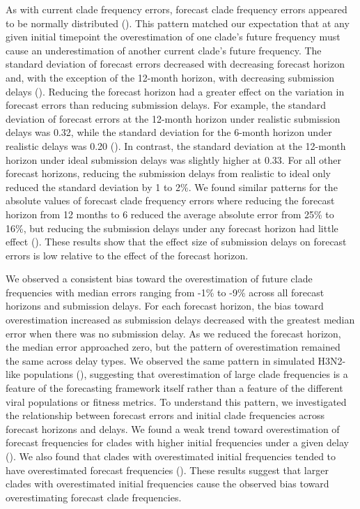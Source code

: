\documentclass[9pt,lineno]{elife}
\begin{document}
As with current clade frequency errors, forecast clade frequency errors appeared to be normally distributed ().
This pattern matched our expectation that at any given initial timepoint the overestimation of one clade's future frequency must cause an underestimation of another current clade's future frequency.
The standard deviation of forecast errors decreased with decreasing forecast horizon and, with the exception of the 12-month horizon, with decreasing submission delays ().
Reducing the forecast horizon had a greater effect on the variation in forecast errors than reducing submission delays.
For example, the standard deviation of forecast errors at the 12-month horizon under realistic submission delays was 0.32, while the standard deviation for the 6-month horizon under realistic delays was 0.20 ().
In contrast, the standard deviation at the 12-month horizon under ideal submission delays was slightly higher at 0.33.
For all other forecast horizons, reducing the submission delays from realistic to ideal only reduced the standard deviation by 1 to 2\%.
We found similar patterns for the absolute values of forecast clade frequency errors where reducing the forecast horizon from 12 months to 6 reduced the average absolute error from 25\% to 16\%, but reducing the submission delays under any forecast horizon had little effect ().
These results show that the effect size of submission delays on forecast errors is low relative to the effect of the forecast horizon.

We observed a consistent bias toward the overestimation of future clade frequencies with median errors ranging from -1\% to -9\% across all forecast horizons and submission delays.
For each forecast horizon, the bias toward overestimation increased as submission delays decreased with the greatest median error when there was no submission delay.
As we reduced the forecast horizon, the median error approached zero, but the pattern of overestimation remained the same across delay types.
We observed the same pattern in simulated H3N2-like populations (), suggesting that overestimation of large clade frequencies is a feature of the forecasting framework itself rather than a feature of the different viral populations or fitness metrics.
To understand this pattern, we investigated the relationship between forecast errors and initial clade frequencies across forecast horizons and delays.
We found a weak trend toward overestimation of forecast frequencies for clades with higher initial frequencies under a given delay ().
We also found that clades with overestimated initial frequencies tended to have overestimated forecast frequencies ().
These results suggest that larger clades with overestimated initial frequencies cause the observed bias toward overestimating forecast clade frequencies.
\end{document}
